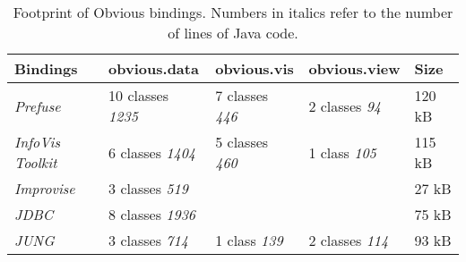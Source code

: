 \begin{table}[h]
\small
\begin{tabular}{|p{\tableCol}|p{\tableCol}|p{\tableCol}|p{\tableCol}|p{\tableCol}|}
    \hline
    \textbf{Bindings} & \textbf{obvious.data} & \textbf{obvious.vis} & \textbf{obvious.view} & \textbf{Size} \\
    \hline
    \textit{Prefuse} & 10 classes \newline\textit{1235} & 7 classes \newline\textit{446} & 2 classes \newline\textit{94} & 120 kB \\
    \hline
    \textit{InfoVis Toolkit} & 6 classes \newline\textit{1404} & 5 classes \newline\textit{460} & 1 class \newline\textit{105} & 115 kB \\
    \hline
    \textit{Improvise} & 3 classes \newline\textit{519} &  &  & 27 kB \\
    \hline
    \textit{JDBC} & 8 classes \newline\textit{1936} &  &  & 75 kB \\
    \hline
    \textit{JUNG} & 3 classes \newline\textit{714} & 1 class \newline\textit{139} & 2 classes \newline\textit{114} & 93 kB \\
    \hline
\end{tabular}
\caption{Footprint of Obvious bindings. Numbers in italics refer to
  the number of lines of Java code.}\label{tab:obviousfootprint}
\end{table}
